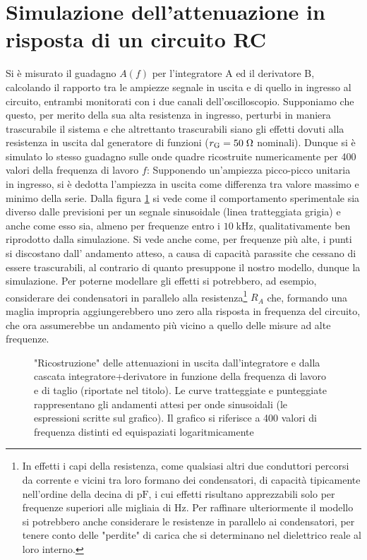 \documentclass{article}[a4paper, oneside ,11pt]
\begin{document}
\section{Simulazione dell'attenuazione in risposta di un circuito RC}
Si è misurato il guadagno $A(f)$ per l’integratore A ed il derivatore B,
calcolando il rapporto tra le ampiezze segnale in uscita e di quello in
ingresso al circuito, entrambi monitorati con i due canali dell’oscilloscopio.
Supponiamo che questo, per merito della sua alta resistenza in ingresso,
perturbi in maniera trascurabile il sistema e che altrettanto trascurabili
siano gli effetti dovuti alla resistenza in uscita dal generatore di funzioni
($r_{\rm G} = 50 \; \Omega$ nominali). Dunque si è simulato lo stesso guadagno
sulle onde quadre ricostruite numericamente per 400 valori della frequenza di
lavoro $f$: Supponendo un'ampiezza picco-picco unitaria in ingresso, si è
dedotta l'ampiezza in uscita come differenza tra valore massimo e minimo della serie.
Dalla figura \ref{plt:gain} si vede come il comportamento sperimentale sia
diverso dalle previsioni per un segnale sinusoidale (linea tratteggiata grigia)
e anche come esso sia, almeno per frequenze entro i $10 \; \si{\kilo\hertz}$,
qualitativamente ben riprodotto dalla simulazione.
Si vede anche come, per frequenze più alte, i punti si discostano dall'
andamento atteso, a causa di capacità parassite che cessano di essere
trascurabili, al contrario di quanto presuppone il nostro modello,
dunque la simulazione. Per poterne modellare gli effetti si potrebbero,
ad esempio, considerare dei condensatori in parallelo alla resistenza\footnote{
In effetti i capi della resistenza, come qualsiasi altri due
conduttori percorsi da corrente e vicini tra loro formano dei condensatori,
di capacità tipicamente nell'ordine della decina di $\si{\pico\F}$, i cui
effetti risultano apprezzabili solo per frequenze superiori alle migliaia
di Hz. Per raffinare ulteriormente il modello si potrebbero anche considerare
le resistenze in parallelo ai condensatori, per tenere conto delle "perdite"
di carica che si determinano nel dielettrico reale al loro interno.}
$R_A$ che, formando una maglia impropria aggiungerebbero uno zero alla risposta
in frequenza del circuito, che ora assumerebbe un andamento più vicino a
quello delle misure ad alte frequenze.
\begin{figure}[!htb]
	\centering 
 		\scalebox{0.9}{}
 	\caption{"Ricostruzione" delle attenuazioni in uscita dall’integratore e dalla cascata integratore+derivatore in funzione della frequenza di lavoro e di taglio (riportate nel titolo). Le curve tratteggiate e punteggiate rappresentano gli andamenti attesi per onde sinusoidali (le espressioni scritte sul grafico). Il grafico si riferisce a 400 valori di frequenza distinti ed equispaziati logaritmicamente \label{plt:gain}}
\end{figure}
\end{document}
